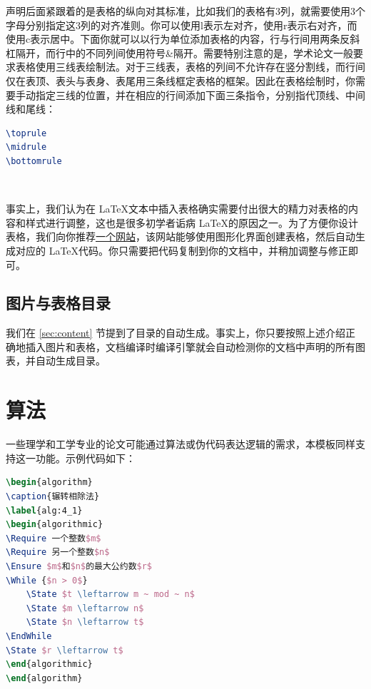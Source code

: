 声明后面紧跟着的是表格的纵向对其标准，比如我们的表格有3列，就需要使用3个字母分别指定这3列的对齐准则。你可以使用{\codefont l}表示左对齐，使用{\codefont r}表示右对齐，而使用{\codefont c}表示居中。下面你就可以以行为单位添加表格的内容，行与行间用两条反斜杠隔开，而行中的不同列间使用符号\&隔开。需要特别注意的是，学术论文一般要求表格使用三线表绘制法。对于三线表，表格的列间不允许存在竖分割线，而行间仅在表顶、表头与表身、表尾用三条线框定表格的框架。因此在表格绘制时，你需要手动指定三线的位置，并在相应的行间添加下面三条指令，分别指代顶线、中间线和尾线：

\begin{tcolorbox}
\begin{lstlisting}[language=TeX]
\toprule
\midrule
\bottomrule
\end{lstlisting}
\end{tcolorbox}

~

事实上，我们认为在 \LaTeX 文本中插入表格确实需要付出很大的精力对表格的内容和样式进行调整，这也是很多初学者诟病 \LaTeX 的原因之一。为了方便你设计表格，我们向你推荐\href{http://www.tablesgenerator.com/}{一个网站}，该网站能够使用图形化界面创建表格，然后自动生成对应的 \LaTeX 代码。你只需要把代码复制到你的文档中，并稍加调整与修正即可。

\subsection{图片与表格目录}

我们在 \ref{sec:content} 节提到了目录的自动生成。事实上，你只要按照上述介绍正确地插入图片和表格，文档编译时编译引擎就会自动检测你的文档中声明的所有图表，并自动生成目录。

\section{算法}

一些理学和工学专业的论文可能通过算法或伪代码表达逻辑的需求，本模板同样支持这一功能。示例代码如下：

\begin{tcolorbox}
\begin{lstlisting}[language=TeX]
\begin{algorithm}
\caption{辗转相除法}
\label{alg:4_1}
\begin{algorithmic}
\Require 一个整数$m$
\Require 另一个整数$n$
\Ensure $m$和$n$的最大公约数$r$
\While {$n > 0$}
    \State $t \leftarrow m ~ mod ~ n$
    \State $m \leftarrow n$
    \State $n \leftarrow t$
\EndWhile
\State $r \leftarrow t$
\end{algorithmic}
\end{algorithm}
\end{lstlisting}
\end{tcolorbox}


